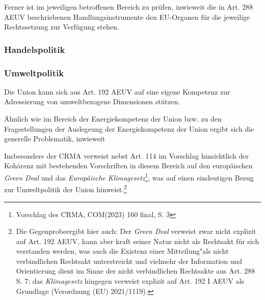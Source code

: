 \documentclass[12pt,a4paper,oneside]{book} %
\begin{document}
	Ferner ist im jeweiligen betroffenen Bereich zu prüfen, inwieweit die in Art. 288 AEUV beschriebenen Handlungsinstrumente den EU-Organen für die jeweilige Rechtssetzung zur Verfügung stehen.
	
	\subsubsection{Handelspolitik}
	
	\subsubsection{Umweltpolitik}
	Die Union kann sich aus Art. 192 AEUV auf eine eigene Kompetenz zur Adressierung von umweltbezogene Dimensionen stützen.
	
	Ähnlich wie im Bereich der Energiekompetenz der Union bzw. zu den Fragestellungen der Auslegeung der Energiekompetenz der Union ergibt sich die generelle Problematik, inwieweit 
	
	Insbesondere der CRMA verweist nebst Art. 114 im Vorschlag hinsichtlich der Kohärenz mit bestehenden Vorschriften in diesem Bereich auf den europäischen \textit{Green Deal} und das \textit{Europäische Klimagesetz}\footnote{Vorschlag des CRMA, COM(2023) 160 final, S. 3}, was auf einen eindeutigen Bezug zur Umweltpolitik der Union hinweist.\footnote{Die \glqq Gegenprobe\grqq ergibt hier auch: Der \textit{Green Deal} verweist zwar nicht explizit auf Art. 192 AEUV, kann aber kraft seiner Natur nicht als Rechtsakt für sich verstanden werden, was auch die Existenz einer \glqq Mitteilung"\grqq als nicht verbindlichen Rechtsakt unterstreicht und vielmehr der Information und Orientierung dient im Sinne der nicht verbindlichen Rechtsakte aus Art. 288 S. 7; das \textit{Klimagesetz} hingegen verweist explizit auf Art. 192 I AEUV als Grundlage (Verordnung (EU) 2021/1119).}
	
\end{document}
